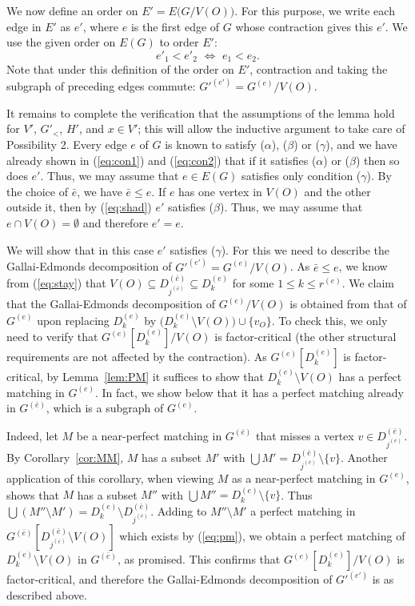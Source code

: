 \documentclass[10pt,a4paper]{amsart}
\begin{document}
We now define an order on $E' = E\bigl(G/V(O)\bigr)$. For this purpose, we write each edge in $E'$ as $e'$, where $e$ is the first edge of $G$ whose contraction gives this $e'$. We use the given order on $E(G)$ to order $E'$: \[ e'_1 < e'_2\,\, \Longleftrightarrow\,\,e_1 < e_2.\]
Note that under this definition of the order on $E'$, contraction and taking the subgraph of preceding edges commute: $G'^{(e')} = G^{(e)}/V(O)$.

It remains to complete the verification that the assumptions of the lemma hold for $V'$, $G'_<$, $H'$, and $x \in V'$; this will allow the inductive argument to take care of Possibility 2. Every edge $e$ of $G$ is known to satisfy ($\alpha$), ($\beta$) or ($\gamma$), and we have already shown in (\ref{eq:con1}) and (\ref{eq:con2}) that if it satisfies ($\alpha$) or ($\beta$) then so does $e'$. Thus, we may assume that $e \in E(G)$ satisfies only condition ($\gamma$). By the choice of $\bar{e}$, we have $\bar{e} \le e$. If $e$ has one vertex in $V(O)$ and the other outside it, then by (\ref{eq:shad}) $e'$ satisfies ($\beta$). Thus, we may assume that $e \cap V(O) = \emptyset$ and therefore $e' = e$.

We will show that in this case $e'$ satisfies ($\gamma$). For this we need to describe the Gallai-Edmonds decomposition of $G'^{(e')} = G^{(e)}/V(O)$. As $\bar{e} \le e$, we know from (\ref{eq:stay}) that $V(O) \subseteq D_{j^{(\bar{e})}}^{(\bar{e})} \subseteq D_k^{(e)}$ for some $1 \le k \le r^{(e)}$. We claim that the Gallai-Edmonds decomposition of $G^{(e)}/V(O)$ is obtained from that of $G^{(e)}$ upon replacing $D_k^{(e)}$ by $\bigl( D_k^{(e)} \setminus V(O)\bigr) \cup \{v_O\}$. To check this, we only need to verify that $G^{(e)}[D_k^{(e)}]/V(O)$ is factor-critical (the other structural requirements are not affected by the contraction). As $G^{(e)}[D_k^{(e)}]$ is factor-critical, by Lemma~\ref{lem:PM} it suffices to show that $D_k^{(e)} \setminus V(O)$ has a perfect matching in $G^{(e)}$. In fact, we show below that it has a perfect matching already in $G^{(\bar{e})}$, which is a subgraph of $G^{(e)}$.

Indeed, let $M$ be a near-perfect matching in $G^{(\bar{e})}$ that misses a vertex $v \in D_{j^{(\bar{e})}}^{(\bar{e})}$. By Corollary~\ref{cor:MM}, $M$ has a subset $M'$ with $\bigcup M' = D_{j^{(\bar{e})}}^{(\bar{e})} \setminus \{v\}$. Another application of this corollary, when viewing $M$ as a near-perfect matching in $G^{(e)}$, shows that $M$ has a subset $M''$ with $\bigcup M'' = D_k^{(e)} \setminus \{v\}$. Thus $\bigcup (M'' \setminus M') = D_k^{(e)} \setminus D_{j^{(\bar{e})}}^{(\bar{e})}$. Adding to $M'' \setminus M'$ a perfect matching in $G^{(\bar{e})}[D_{j^{(\bar{e})}}^{(\bar{e})} \setminus V(O)]$ which exists by (\ref{eq:pm}), we obtain a perfect matching of $D_k^{(e)} \setminus V(O)$ in $G^{(\bar{e})}$, as promised. This confirms that $G^{(e)}[D_k^{(e)}]/V(O)$ is factor-critical, and therefore the Gallai-Edmonds decomposition of $G'^{(e')}$ is as described above.
\end{document}
